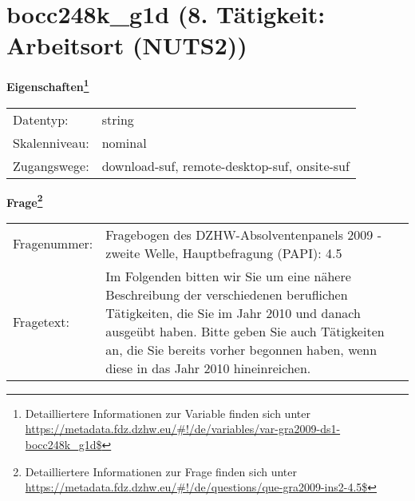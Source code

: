 
    \setcounter{footnote}{0}

    \vspace*{-1.8cm}
	\section{bocc248k\_g1d (8. Tätigkeit: Arbeitsort (NUTS2))}
	\label{section:bocc248k_g1d}



    \vspace*{0.5cm}
    \noindent\textbf{Eigenschaften\footnote{Detailliertere Informationen zur Variable finden sich unter
		\url{https://metadata.fdz.dzhw.eu/\#!/de/variables/var-gra2009-ds1-bocc248k_g1d$}}}\\
	\begin{tabularx}{\hsize}{@{}lX}
	Datentyp: & string \\
	Skalenniveau: & nominal \\
	Zugangswege: &
	  download-suf, 
	  remote-desktop-suf, 
	  onsite-suf
 \\
    \end{tabularx}



				\vspace*{0.5cm}
                \noindent\textbf{Frage\footnote{Detailliertere Informationen zur Frage finden sich unter
		              \url{https://metadata.fdz.dzhw.eu/\#!/de/questions/que-gra2009-ins2-4.5$}}}\\
				\begin{tabularx}{\hsize}{@{}lX}
					Fragenummer: &
					  Fragebogen des DZHW-Absolventenpanels 2009 - zweite Welle, Hauptbefragung (PAPI):
					  4.5
 \\
					Fragetext: & Im Folgenden bitten wir Sie um eine nähere Beschreibung der verschiedenen beruflichen Tätigkeiten, die Sie im Jahr 2010 und danach ausgeübt haben. Bitte geben Sie auch Tätigkeiten an, die Sie bereits vorher begonnen haben, wenn diese in das Jahr 2010 hineinreichen. \\
				\end{tabularx}





